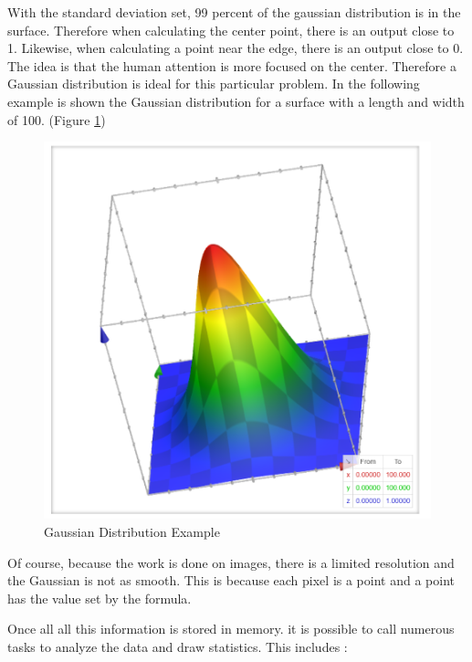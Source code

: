\documentclass[a4paper,11pt]{report}
\numberwithin{figure}{section} %
\begin{document}
    With the standard deviation set, 99 percent of the gaussian distribution is in the surface. Therefore when calculating the center point, there is an output close to 1. Likewise, when calculating a point near the edge, there is an output close to 0.
    The idea is that the human attention is more focused on the center. Therefore a Gaussian distribution is ideal for this particular problem. In the following example is shown the Gaussian distribution for a surface with a length and width of 100. (Figure \ref{fig:gaus22})

    \begin{figure}[H]
      \centering
      \includegraphics[width=.45\linewidth]{gaussian2D.png}
      \caption{Gaussian Distribution Example}
      \label{fig:gaus22}
    \end{figure}

    Of course, because the work is done on images, there is a limited resolution and the Gaussian is not as smooth. This is because each pixel is a point and a point has the value set by the formula.
    \newline

    Once all all this information is stored in memory. it is possible to call numerous tasks to analyze the data and draw statistics. This includes :
\end{document}
